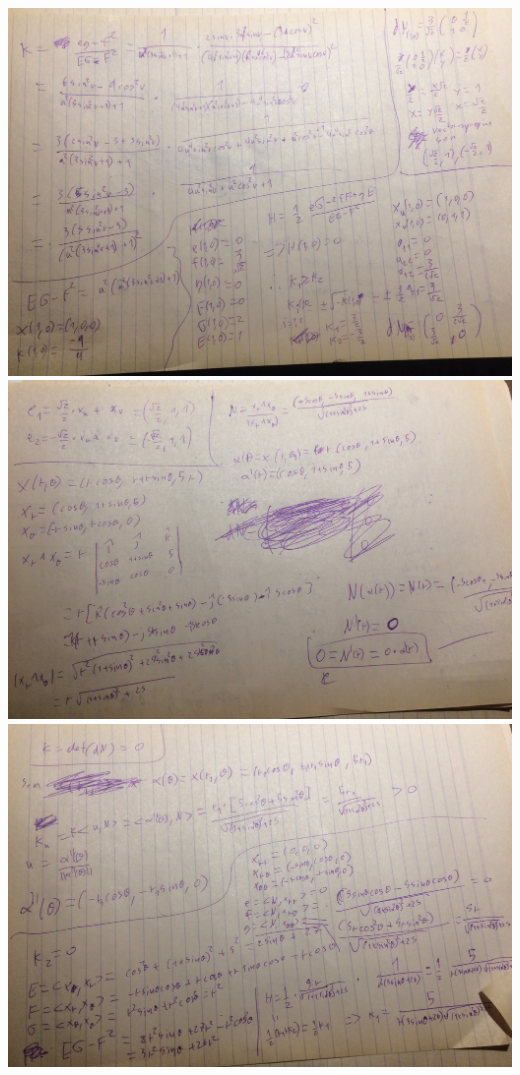 \includegraphics{img/IMG_5985.JPG}
\includegraphics{img/IMG_5986.JPG}
\includegraphics{img/IMG_5987.JPG}
